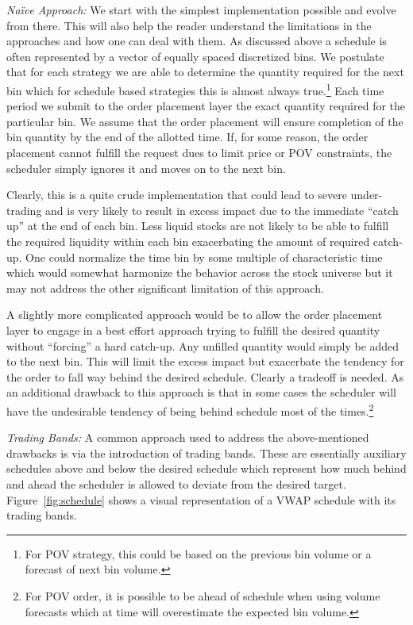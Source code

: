 \noindent\emph{Na\"ive Approach:} We start with the simplest implementation possible and evolve from there. This will also help the reader understand the limitations in the approaches and how one can deal with them. As discussed above a schedule is often represented by a vector of equally spaced discretized bins. We postulate that for each strategy we are able to determine the quantity required for the next bin which for schedule based strategies this is almost always true.\footnote{For POV strategy, this could be based on the previous bin volume or a forecast of next bin volume.} Each time period we submit to the order placement layer the exact quantity required for the particular bin. We assume that the order placement will ensure completion of the bin quantity by the end of the allotted time. If, for some reason, the order placement cannot fulfill the request dues to limit price or POV constraints, the scheduler simply ignores it and moves on to the next bin. 


Clearly, this is a quite crude implementation that could lead to severe under-trading and is very likely to result in excess impact due to the immediate ``catch up'' at the end of each bin. Less liquid stocks are not likely to be able to fulfill the required liquidity within each bin exacerbating the amount of required catch-up. One could normalize the time bin by some multiple of characteristic time which would somewhat harmonize the behavior across the stock universe but it may not address the other significant limitation of this approach.


A slightly more complicated approach would be to allow the order placement layer to engage in a best effort approach trying to fulfill the desired quantity without ``forcing'' a hard catch-up. Any unfilled quantity would simply be added to the next bin. This will limit the excess impact but exacerbate the tendency for the order to fall way behind the desired schedule. Clearly a tradeoff is needed. As an additional drawback to this approach is that in some cases the scheduler will have the undesirable tendency of being behind schedule most of the times.\footnote{For POV order, it is possible to be ahead of schedule when using volume forecasts which at time will overestimate the expected bin volume.} \twomedskip


\noindent\emph{Trading Bands:} A common approach used to address the above-mentioned drawbacks is via the introduction of trading bands. These are essentially auxiliary schedules above and below the desired schedule which represent how much behind and ahead the scheduler is allowed to deviate from the desired target. Figure~\ref{fig:schedule} shows a visual representation of a VWAP schedule with its trading bands. 


